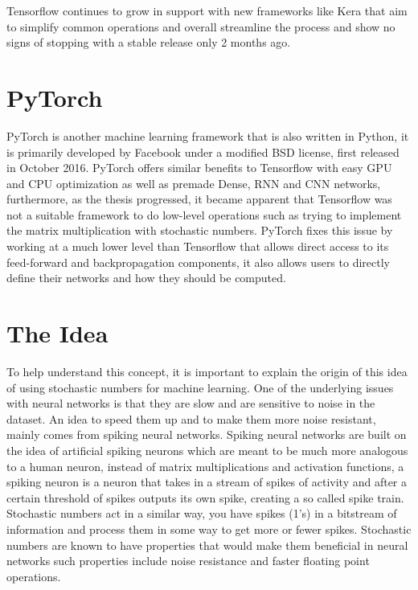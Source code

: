 \documentclass[a4paper,oneside,phd,etd]{BYUPhys}
\begin{document}
Tensorflow continues to grow in support with new frameworks like Kera that aim to simplify common operations and overall streamline the process and show no signs of stopping with a stable release only 2 months ago.

\section{PyTorch}
PyTorch\cite{pytorch} is another machine learning framework that is also written in Python, it is primarily developed by Facebook under a modified BSD license, first released in October 2016. PyTorch offers similar benefits to Tensorflow with easy GPU and CPU optimization as well as premade Dense, RNN and CNN networks, furthermore, as the thesis progressed, it became apparent that Tensorflow was not a suitable framework to do low-level operations such as trying to implement the matrix multiplication with stochastic numbers. PyTorch fixes this issue by working at a much lower level than Tensorflow that allows direct access to its feed-forward and backpropagation components, it also allows users to directly define their networks and how they should be computed.

\section{The Idea}
To help understand this concept, it is important to explain the origin of this idea of using stochastic numbers for machine learning. One of the underlying issues with neural networks is that they are slow and are sensitive to noise in the dataset. An idea to speed them up and to make them more noise resistant, mainly comes from spiking neural networks. Spiking neural networks are built on the idea of artificial spiking neurons which are meant to be much more analogous to a human neuron, instead of matrix multiplications and activation functions, a spiking neuron is a neuron that takes in a stream of spikes of activity and after a certain threshold of spikes outputs its own spike, creating a so called spike train. Stochastic numbers act in a similar way, you have spikes (1's) in a bitstream of information and process them in some way to get more or fewer spikes. Stochastic numbers are known to have properties that would make them beneficial in neural networks such properties include noise resistance and faster floating point operations.
\end{document}
